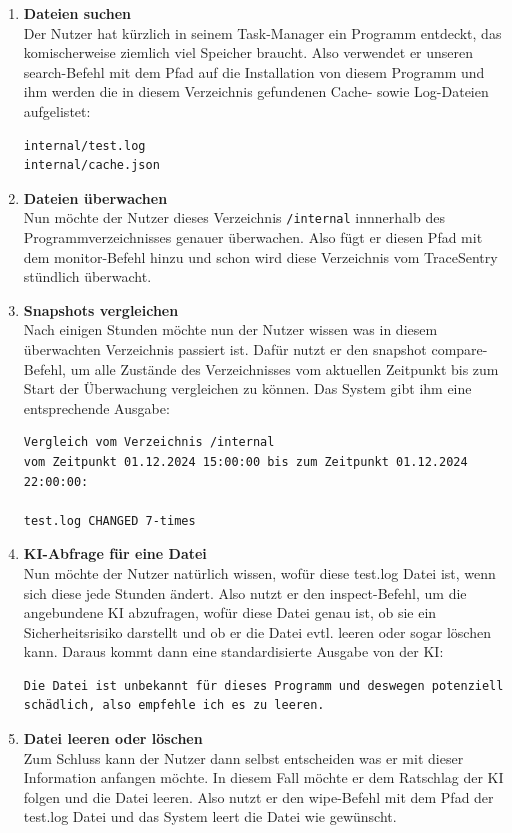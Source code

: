 \documentclass[a4paper,12pt]{report}
\begin{document}
    \begin{enumerate}
        \item \textbf{Dateien suchen}\\
        Der Nutzer hat kürzlich in seinem Task-Manager ein Programm entdeckt, das komischerweise
        ziemlich viel Speicher braucht.
        Also verwendet er unseren search-Befehl mit dem Pfad auf die Installation von diesem Programm
        und ihm werden die in diesem Verzeichnis gefundenen Cache- sowie Log-Dateien aufgelistet:
        \begin{verbatim}
internal/test.log
internal/cache.json
        \end{verbatim}

        \item \textbf{Dateien überwachen}\\
        Nun möchte der Nutzer dieses Verzeichnis \texttt{/internal} innnerhalb des Programmverzeichnisses genauer überwachen.
        Also fügt er diesen Pfad mit dem monitor-Befehl hinzu und schon wird diese Verzeichnis vom TraceSentry stündlich überwacht.

        \item \textbf{Snapshots vergleichen}\\
        Nach einigen Stunden möchte nun der Nutzer wissen was in diesem überwachten Verzeichnis passiert ist.
        Dafür nutzt er den snapshot compare-Befehl, um alle Zustände des Verzeichnisses vom aktuellen Zeitpunkt bis zum Start der Überwachung vergleichen zu können.
        Das System gibt ihm eine entsprechende Ausgabe:
        \begin{verbatim}
Vergleich vom Verzeichnis /internal
vom Zeitpunkt 01.12.2024 15:00:00 bis zum Zeitpunkt 01.12.2024 22:00:00:

test.log CHANGED 7-times
        \end{verbatim}

        \item \textbf{KI-Abfrage für eine Datei}\\
        Nun möchte der Nutzer natürlich wissen, wofür diese test.log Datei ist, wenn sich diese jede Stunden ändert.
        Also nutzt er den inspect-Befehl, um die angebundene KI abzufragen, wofür diese Datei genau ist, ob sie ein Sicherheitsrisiko darstellt
        und ob er die Datei evtl. leeren oder sogar löschen kann.
        Daraus kommt dann eine standardisierte Ausgabe von der KI:
        \begin{verbatim}
Die Datei ist unbekannt für dieses Programm und deswegen potenziell
schädlich, also empfehle ich es zu leeren.
        \end{verbatim}

        \item \textbf{Datei leeren oder löschen}\\
        Zum Schluss kann der Nutzer dann selbst entscheiden was er mit dieser Information anfangen möchte.
        In diesem Fall möchte er dem Ratschlag der KI folgen und die Datei leeren.
        Also nutzt er den wipe-Befehl mit dem Pfad der test.log Datei und das System leert die Datei wie gewünscht.
    \end{enumerate}
\end{document}

